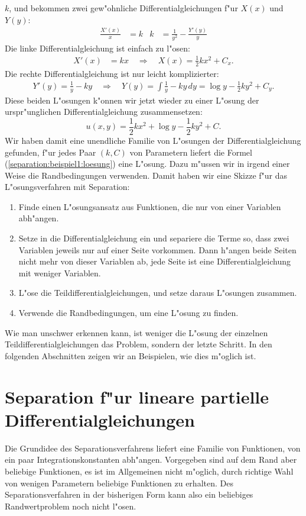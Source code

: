 $k$, und bekommen zwei gew"ohnliche Differentialgleichungen
f"ur $X(x)$ und $Y(y)$:
\begin{align}
\frac{X'(x)}{x}&=k
&
k&=\frac1{y^2}-\frac{Y'(y)}{y}
\label{separation:beispiel1:separiertedgl}
\end{align}
Die linke Differentialgleichung ist einfach zu l"osen:
\begin{align*}
X'(x)&=kx\quad\Rightarrow\quad X(x)=
\frac12kx^2+C_x.
\end{align*}
Die rechte Differentialgleichung ist nur leicht komplizierter:
\begin{align*}
Y'(y)=\frac1y-ky
\quad\Rightarrow\quad
Y(y)=\int\frac1y-ky\,dy=
\log y-\frac12ky^2+C_y.
\end{align*}
Diese beiden L"osungen k"onnen wir jetzt wieder zu einer L"osung der
urspr"unglichen Differentialgleichung zusammensetzen:
\begin{equation}
u(x,y)=
\frac12kx^2+
\log y-\frac12ky^2+C.
\label{separation:beispiel1:loesung}
\end{equation}
Wir haben damit eine unendliche Familie von L"osungen der
Differentialgleichung gefunden, f"ur jedes Paar $(k,C)$ von
Parametern liefert die Formel (\ref{separation:beispiel1:loesung})
eine L"osung.
Dazu m"ussen wir in irgend einer Weise die Randbedingungen verwenden.
Damit haben wir eine Skizze f"ur das L"osungsverfahren mit Separation:
\begin{enumerate}
\item Finde einen L"osungsansatz aus Funktionen, die nur von einer
Variablen abh"angen.
\item Setze in die Differentialgleichung ein und separiere die Terme
so, dass zwei Variablen jeweils nur auf einer Seite vorkommen. Dann
h"angen beide Seiten nicht mehr von dieser Variablen ab, jede Seite
ist eine Differentialgleichung mit weniger Variablen.
\item L"ose die Teildifferentialgleichungen, und setze daraus 
L"osungen zusammen. 
\item Verwende die Randbedingungen, um eine L"osung zu finden.
\end{enumerate}
Wie man unschwer erkennen kann, ist weniger die L"osung der
einzelnen Teildifferentialgleichungen das Problem, sondern der letzte
Schritt. In den folgenden Abschnitten zeigen wir an Beispielen, wie
dies m"oglich ist.

\section{Separation f"ur lineare partielle Differentialgleichungen}
Die Grundidee des Separationsverfahrens liefert eine Familie von Funktionen,
von ein paar Integrationskonstanten abh"angen. Vorgegeben sind auf dem
Rand aber beliebige Funktionen, es ist im Allgemeinen nicht m"oglich,
durch richtige Wahl von wenigen Parametern beliebige Funktionen zu erhalten.
Des Separationsverfahren in der bisherigen Form kann also ein
beliebiges Randwertproblem noch nicht l"osen.

